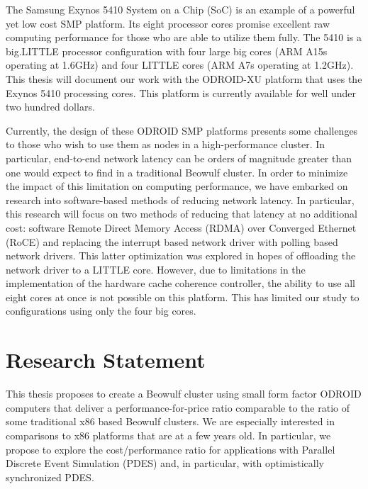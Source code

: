 \documentclass[11pt]{book}
\begin{document}
The Samsung Exynos 5410 System on a Chip (SoC) is an example of a powerful yet low cost
SMP platform.  Its eight processor cores promise excellent raw computing performance for
those who are able to utilize them fully.  The 5410 is a big.LITTLE processor
configuration with four large big cores (ARM A15s operating at 1.6GHz) and four LITTLE
cores (ARM A7s operating at 1.2GHz).  This thesis will document our work with the
ODROID-XU platform that uses the Exynos 5410 processing cores.  This platform is currently
available for well under two hundred dollars.

Currently, the design of these ODROID SMP platforms presents some challenges to those who
wish to use them as nodes in a high-performance cluster.  In particular, end-to-end
network latency can be orders of magnitude greater than one would expect to find in a
traditional Beowulf cluster.  In order to minimize the impact of this limitation on
computing performance, we have embarked on research into software-based methods of
reducing network latency.  In particular, this research will focus on two methods of
reducing that latency at no additional cost: software Remote Direct Memory Access (RDMA)
over Converged Ethernet (RoCE) and replacing the interrupt based network driver with
polling based network drivers.  This latter optimization was explored in hopes of
offloading the network driver to a LITTLE core.  However, due to limitations in the
implementation of the hardware cache coherence controller, the ability to use all eight
cores at once is not possible on this platform.  This has limited our study to
configurations using only the four big cores.

\section{\textbf{Research Statement}}

This thesis proposes to create a Beowulf cluster using small form factor ODROID computers
that deliver a performance-for-price ratio comparable to the ratio of some traditional x86
based Beowulf clusters.  We are especially interested in comparisons to x86 platforms that
are at a few years old.  In particular, we propose to explore the cost/performance ratio
for applications with Parallel Discrete Event Simulation (PDES) and, in particular, with
optimistically synchronized \cite{fujimoto-90,jefferson-85} PDES.
\end{document}
